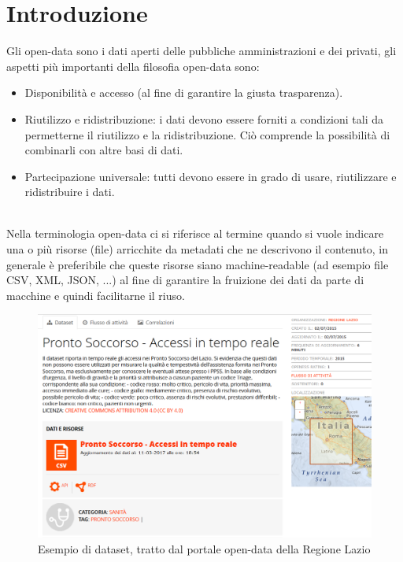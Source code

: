 \documentclass{article}
\theoremstyle{plain}
\theoremstyle{definition}
\begin{document}
\section{Introduzione}
Gli open-data sono i dati aperti delle pubbliche amministrazioni e dei privati, gli aspetti più importanti della filosofia open-data sono:
\begin{itemize}
\item Disponibilità e accesso (al fine di garantire la giusta trasparenza).
\item Riutilizzo e ridistribuzione: i dati devono essere forniti a condizioni tali da permetterne il riutilizzo e la ridistribuzione. Ciò comprende la possibilità di combinarli con altre basi di dati.
\item Partecipazione universale: tutti devono essere in grado di usare, riutilizzare e ridistribuire i dati.
\end{itemize}
\phantom
\\
Nella terminologia open-data ci si riferisce al termine  quando si vuole indicare una o più risorse (file) arricchite da metadati che ne descrivono il contenuto, in generale è preferibile che queste risorse siano machine-readable (ad esempio file CSV, XML, JSON, ...) al fine di garantire la fruizione dei dati da parte di macchine e quindi facilitarne il riuso.
\begin{figure}[htbp]
\begin{center}
\includegraphics[scale=0.50]{img/datasetesempio.png}
\caption{Esempio di dataset, tratto dal portale open-data della Regione Lazio}
\end{center}
\end{figure}
\\
\end{document}
